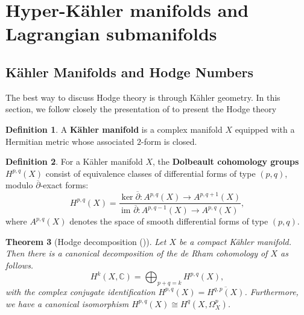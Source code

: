 \documentclass{article}
\newtheorem{theorem}{Theorem}[section]
\theoremstyle{definition}
\newtheorem{definition}[theorem]{Definition}
\begin{document}
\section{Hyper-Kähler manifolds and Lagrangian submanifolds}\label{SectionSurface}

\subsection{Kähler Manifolds and Hodge Numbers}\label{SubsectionHodgeDecomp}
The best way to discuss Hodge theory is through Kähler geometry. In this section, we follow closely the presentation of \cite[Chapter 6]{VoisinHodge} to present the Hodge theory

\begin{definition}
A \textbf{Kähler manifold} is a complex manifold $X$ equipped with a Hermitian metric whose associated $2$-form is closed.
\end{definition}

\begin{definition}
For a Kähler manifold $X$, the \textbf{Dolbeault cohomology groups} $H^{p,q}(X)$ consist of equivalence classes of differential forms of type $(p,q)$, modulo $\overline{\partial}$-exact forms:
$$H^{p,q}(X) = \frac{\ker \overline{\partial}: A^{p,q}(X) \to A^{p,q+1}(X)}{\text{im } \overline{\partial}: A^{p,q-1}(X) \to A^{p,q}(X)},$$
where $A^{p,q}(X)$ denotes the space of smooth differential forms of type $(p,q)$.
\end{definition}

\begin{theorem}[Hodge decomposition (\cite{VoisinHodge})]
    Let $X$ be a compact Kähler manifold. Then there is a canonical decomposition of the de Rham cohomology of $X$ as follows.
    \[
    H^k(X,\mathbb C) = \bigoplus_{p + q = k} H^{p, q}(X),
    \]
    with the complex conjugate identification $H^{p, q}(X) = \overline{H^{q, p}(X)}$.
    Furthermore, we have a canonical isomorphism $H^{p, q}(X) \cong H^q(X, \Omega_X^p)$.
\end{theorem}
\end{document}
